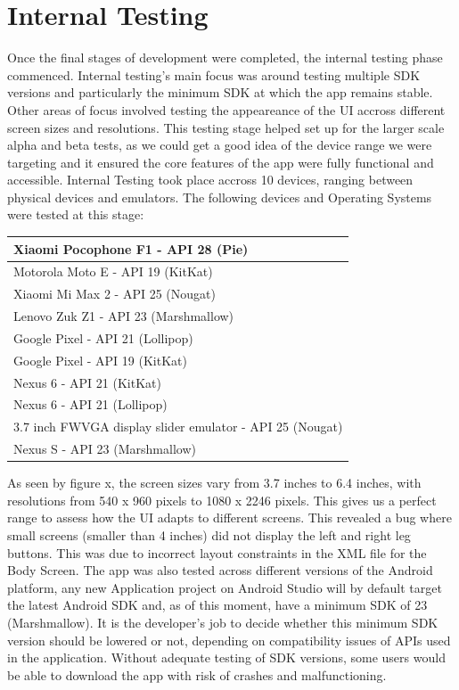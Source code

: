 \section{Internal Testing}
Once the final stages of development were completed, the internal testing phase commenced. Internal testing's main focus was around testing multiple SDK versions and particularly the minimum SDK at which the app remains stable. Other areas of focus involved testing the appeareance of the UI accross different screen sizes and resolutions. This testing stage helped set up for the larger scale alpha and beta tests, as we could get a good idea of the device range we were targeting and it ensured the core features of the app were fully functional and accessible. Internal Testing took place accross 10 devices, ranging between physical devices and emulators. The following devices and Operating Systems were tested at this stage:
\begin{table}[ht]
\begin{tabular}{|l|}
\hline
Xiaomi Pocophone F1 - API 28 (Pie)                       \\ \hline
Motorola Moto E - API 19 (KitKat)                        \\ \hline
Xiaomi Mi Max 2 - API 25 (Nougat)                        \\ \hline
Lenovo Zuk Z1 - API 23 (Marshmallow)                     \\ \hline
Google Pixel - API 21 (Lollipop)                         \\ \hline
Google Pixel - API 19 (KitKat)                           \\ \hline
Nexus 6 - API 21 (KitKat)                                \\ \hline
Nexus 6 - API 21 (Lollipop)                              \\ \hline
3.7 inch FWVGA display slider emulator - API 25 (Nougat) \\ \hline
Nexus S - API 23 (Marshmallow)                           \\ \hline
\end{tabular}
\end{table}
\par
As seen by figure x, the screen sizes vary from 3.7 inches to 6.4 inches, with resolutions from 540 x 960 pixels to 1080 x 2246 pixels. This gives us a perfect range to assess how the UI adapts to different screens. This revealed a bug where small screens (smaller than 4 inches) did not display the left and right leg buttons. This was due to incorrect layout constraints in the XML file for the Body Screen. The app was also tested across different versions of the Android platform, any new Application project on Android Studio will by default target the latest Android SDK and, as of this moment, have a minimum SDK of 23 (Marshmallow). It is the developer's job to decide whether this minimum SDK version should be lowered or not, depending on compatibility issues of APIs used in the application. Without adequate testing of SDK versions, some users would be able to download the app with risk of crashes and malfunctioning.
